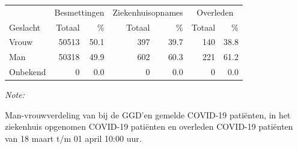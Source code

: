 \documentclass[
  english,
  man,floatsintext]{apa6}
\begin{document}
\begin{table}
\centering\begingroup\fontsize{11}{13}\selectfont

\begin{threeparttable}
\begin{tabular}{lrrrrrr}
\toprule
\multicolumn{1}{c}{ } & \multicolumn{2}{c}{Besmettingen} & \multicolumn{2}{c}{Ziekenhuisopnames} & \multicolumn{2}{c}{Overleden} \\
\cmidrule(l{3pt}r{3pt}){2-3} \cmidrule(l{3pt}r{3pt}){4-5} \cmidrule(l{3pt}r{3pt}){6-7}
Geslacht & Totaal & \% & Totaal & \% & Totaal & \%\\
\midrule
Vrouw & 50513 & 50.1 & 397 & 39.7 & 140 & 38.8\\
Man & 50318 & 49.9 & 602 & 60.3 & 221 & 61.2\\
Onbekend & 0 & 0.0 & 0 & 0.0 & 0 & 0.0\\
\bottomrule
\end{tabular}
\begin{tablenotes}
\item \textit{Note: } 
\item Man-vrouwverdeling van bij de GGD’en gemelde COVID-19 patiënten, in het ziekenhuis opgenomen COVID-19 patiënten en overleden COVID-19 patiënten van 18 maart t/m 01 april 10:00 uur.
\end{tablenotes}
\end{threeparttable}
\endgroup{}
\end{table}
\newpage
\end{document}
